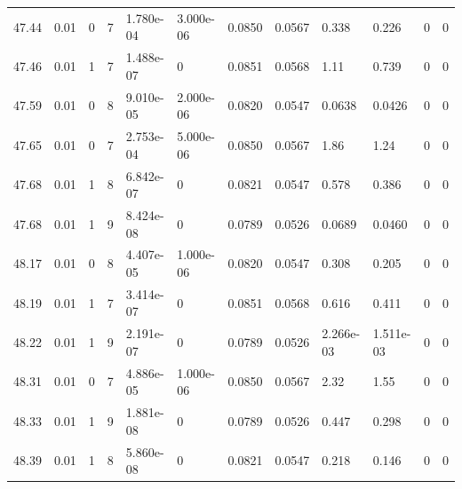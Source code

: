 \documentclass[preview]{standalone}
\begin{document}
{{{{{{{{{{{{\begin{tabular}{L{1.2cm}C{1.2cm} C{0.3cm}C{0.5cm} C{1.4cm}C{1.4cm} C{1.4cm}C{1.4cm} C{1.6cm}C{1.6cm} C{1.6cm}C{1.6cm}}
  47.44  &  0.01  & 0     &  7 &  1.780e-04  & 3.000e-06  &  0.0850&   0.0567& 0.338 & 0.226   &  0 & 0  \\ 
  47.46  &  0.01  & 1     &  7 &  1.488e-07  & 0  &  0.0851&   0.0568& 1.11 & 0.739   &  0 & 0  \\ 
  47.59  &  0.01  & 0     &  8 &  9.010e-05  & 2.000e-06  &  0.0820&   0.0547& 0.0638 & 0.0426   &  0 & 0  \\ 
  47.65  &  0.01  & 0     &  7 &  2.753e-04  & 5.000e-06  &  0.0850&   0.0567& 1.86 & 1.24   &  0 & 0  \\ 
  47.68  &  0.01  & 1     &  8 &  6.842e-07  & 0  &  0.0821&   0.0547& 0.578 & 0.386   &  0 & 0  \\ 
  47.68  &  0.01  & 1     &  9 &  8.424e-08  & 0  &  0.0789&   0.0526& 0.0689 & 0.0460   &  0 & 0  \\ 
  48.17  &  0.01  & 0     &  8 &  4.407e-05  & 1.000e-06  &  0.0820&   0.0547& 0.308 & 0.205   &  0 & 0  \\ 
  48.19  &  0.01  & 1     &  7 &  3.414e-07  & 0  &  0.0851&   0.0568& 0.616 & 0.411   &  0 & 0  \\ 
  48.22  &  0.01  & 1     &  9 &  2.191e-07  & 0  &  0.0789&   0.0526& 2.266e-03 & 1.511e-03   &  0 & 0  \\ 
  48.31  &  0.01  & 0     &  7 &  4.886e-05  & 1.000e-06  &  0.0850&   0.0567& 2.32 & 1.55   &  0 & 0  \\ 
  48.33  &  0.01  & 1     &  9 &  1.881e-08  & 0  &  0.0789&   0.0526& 0.447 & 0.298   &  0 & 0  \\ 
  48.39  &  0.01  & 1     &  8 &  5.860e-08  & 0  &  0.0821&   0.0547& 0.218 & 0.146   &  0 & 0  \\ 
\hline 
\end{tabular} 

}}}}}}}}}}}}
\end{document}
